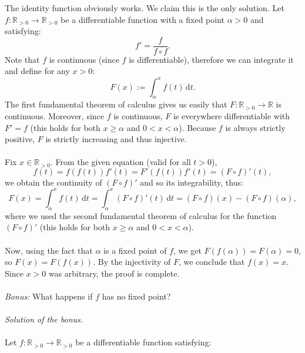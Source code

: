 \begin{solution}
    The identity function obviously works. We claim this is the only solution. Let \( f:\mathbb{R}_{>0}\to\mathbb{R}_{>0} \) be a differentiable function with a fixed point \( \alpha>0 \) and satisfying:
    \[
        f' = \frac{f}{f \circ f}.
    \]
    Note that \( f \) is continuous (since \( f \) is differentiable), therefore we can integrate it and define for any \( x>0 \):
    \[
        F\left(x\right) := \int_{\alpha}^{x} f\left(t\right) \, \mathrm{d}t.
    \]
    The first fundamental theorem of calculus gives us easily that \( F:\mathbb{R}_{>0}\to\mathbb{R} \) is continuous. Moreover, since \( f \) is continuous, \( F \) is everywhere differentiable with \( F' = f \) (this holds for both \( x \geq \alpha \) and \( 0<x < \alpha \)). Because \( f \) is always strictly positive, \( F \) is strictly increasing and thus injective.
    \\\\
    Fix \( x \in \mathbb{R}_{>0} \). From the given equation (valid for all \( t>0 \)),
    \[
        f\left(t\right) = f\left(f\left(t\right)\right) f'\left(t\right) = F'\left(f\left(t\right)\right) f'\left(t\right) = \left(F \circ f\right)'\left(t\right),
    \]
    we obtain the continuity of \( \left(F \circ f\right)' \) and so its integrability, thus:
    \[
        F\left(x\right) = \int_{\alpha}^{x} f\left(t\right) \, \mathrm{d}t = \int_{\alpha}^{x} \left(F \circ f\right)'\left(t\right) \, \mathrm{d}t = \left(F \circ f\right)\left(x\right) - \left(F \circ f\right)\left(\alpha\right),
    \]
    where we used the second fundamental theorem of calculus for the function \( \left(F \circ f\right)' \) (this holds for both \( x \geq \alpha \) and \( 0<x < \alpha \)).
    \\\\
    Now, using the fact that \( \alpha \) is a fixed point of \( f \), we get \( F\left(f\left(\alpha\right)\right) = F\left(\alpha\right) = 0 \), so \( F\left(x\right) = F\left(f\left(x\right)\right) \). By the injectivity of \( F \), we conclude that \( f\left(x\right) = x \). Since \( x > 0 \) was arbitrary, the proof is complete.
    \\\\
    \textit{Bonus:} What happens if \( f \) has no fixed point?
    \\\\
    \textit{Solution of the bonus.}
    \\\\
    Let \( f:\mathbb{R}_{>0}\to\mathbb{R}_{>0} \) be a differentiable function satisfying:

\end{solution}
